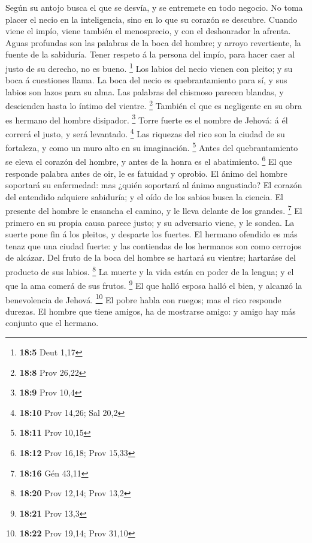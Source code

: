  Según su antojo busca el que se desvía, y se entremete en
todo negocio.  No toma placer el necio en la inteligencia,
sino en lo que su corazón se descubre.  Cuando viene el
impío, viene también el menosprecio, y con el deshonrador la afrenta.
 Aguas profundas son las palabras de la boca del hombre; y
arroyo revertiente, la fuente de la sabiduría.  Tener
respeto á la persona del impío, para hacer caer al justo de su derecho,
no es bueno. \footnote{\textbf{18:5} Deut 1,17}  Los
labios del necio vienen con pleito; y su boca á cuestiones llama.
 La boca del necio es quebrantamiento para sí, y sus
labios son lazos para su alma.  Las palabras del chismoso
parecen blandas, y descienden hasta lo íntimo del vientre. \footnote{\textbf{18:8}
  Prov 26,22}  También el que es negligente en su obra es
hermano del hombre disipador. \footnote{\textbf{18:9} Prov 10,4}
 Torre fuerte es el nombre de Jehová: á él correrá el
justo, y será levantado. \footnote{\textbf{18:10} Prov 14,26; Sal 20,2}
 Las riquezas del rico son la ciudad de su fortaleza, y
como un muro alto en su imaginación. \footnote{\textbf{18:11} Prov 10,15}
 Antes del quebrantamiento se eleva el corazón del
hombre, y antes de la honra es el abatimiento. \footnote{\textbf{18:12}
  Prov 16,18; Prov 15,33}  El que responde palabra antes
de oir, le es fatuidad y oprobio.  El ánimo del hombre
soportará su enfermedad: mas ¿quién soportará al ánimo angustiado?
 El corazón del entendido adquiere sabiduría; y el oído
de los sabios busca la ciencia.  El presente del hombre
le ensancha el camino, y le lleva delante de los grandes. \footnote{\textbf{18:16}
  Gén 43,11}  El primero en su propia causa parece justo;
y su adversario viene, y le sondea.  La suerte pone fin á
los pleitos, y desparte los fuertes.  El hermano ofendido
es más tenaz que una ciudad fuerte: y las contiendas de los hermanos son
como cerrojos de alcázar.  Del fruto de la boca del
hombre se hartará su vientre; hartaráse del producto de sus labios.
\footnote{\textbf{18:20} Prov 12,14; Prov 13,2}  La
muerte y la vida están en poder de la lengua; y el que la ama comerá de
sus frutos. \footnote{\textbf{18:21} Prov 13,3}  El que
halló esposa halló el bien, y alcanzó la benevolencia de Jehová.
\footnote{\textbf{18:22} Prov 19,14; Prov 31,10}  El
pobre habla con ruegos; mas el rico responde durezas.  El
hombre que tiene amigos, ha de mostrarse amigo: y amigo hay más conjunto
que el hermano.

